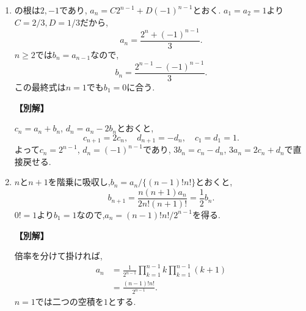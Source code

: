 \begin{enumerate}[label=\textbf{問\arabic*.},leftmargin=3.8em,format=\bookitemlink{practice-basic}{solution}{problem}]
          \item {}
                  の根は$2,-1$であり,
                  $a_n=C2^{n-1}+D(-1)^{n-1}$とおく.
                  $a_1=a_2=1$より$C=2/3,D=1/3$だから,
                  \[
                    a_n=\frac{2^n+(-1)^{n-1}}3.
                  \]
                  $n\ge2$では$b_n=a_{n-1}$なので,
                  \[
                    b_n=\frac{2^{n-1}-(-1)^{n-1}}3.
                  \]
                  この最終式は$n=1$でも$b_1=0$に合う.
                  \par\smallskip\noindent\textbf{【別解】}\par
                  $c_n=a_n+b_n$, $d_n=a_n-2b_n$とおくと,
                  \[
                    c_{n+1}=2c_n,\quad d_{n+1}=-d_n,
                    \quad c_1=d_1=1.
                  \]
                  よって$c_n=2^{n-1}$, $d_n=(-1)^{n-1}$であり,
                  $3b_n=c_n-d_n$, $3a_n=2c_n+d_n$で直接戻せる.

          \item $n$と$n+1$を階乗に吸収し,$b_n=a_n/\{(n-1)!n!\}$とおくと,
                  \[
                    b_{n+1}=\frac{n(n+1)a_n}{2n!(n+1)!}
                           =\frac12b_n.
                  \]
                  $0!=1$より$b_1=1$なので,$a_n=(n-1)!n!/2^{n-1}$を得る.
                  \par\smallskip\noindent\textbf{【別解】}\par
                  倍率を分けて掛ければ,
                  \[
                  \begin{aligned}
                    a_n&=\frac1{2^{n-1}}\prod_{k=1}^{n-1}k
                                               \prod_{k=1}^{n-1}(k+1)\\
                       &=\frac{(n-1)!n!}{2^{n-1}}.
                  \end{aligned}
                  \]
                  $n=1$では二つの空積を$1$とする.


\end{enumerate}
